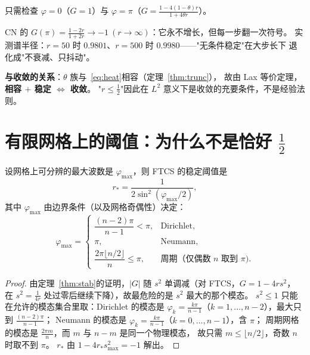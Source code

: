\begin{corollary}[稳定性只由两个数决定]
只需检查 $\varphi=0$（$G=1$）与 $\varphi=\pi$（$G=\frac{1-4(1-\theta)r}{1+4\theta r}$）。
\end{corollary}

\begin{corollary}[CN 的"稳定"退化]
\label{cor:cn}
CN 的 $G(\pi)=\frac{1-2r}{1+2r}\to-1\ (r\to\infty)$：它永不增长，但每一步翻一次符号。
实测谱半径：$r=50$ 时 $0.9801$、$r=500$ 时 $0.9980$——"无条件稳定"在大步长下
退化成"不衰减、只抖动"。
\end{corollary}

\textbf{与收敛的关系}：$\theta$ 族与~\eqref{eq:heat}相容（定理~\ref{thm:trunc}），
故由 Lax 等价定理，\textbf{相容 $+$ 稳定 $\iff$ 收敛}。
"$r\le\frac12$"因此在 $L^2$ 意义下是收敛的充要条件，不是经验法则。

\section{有限网格上的阈值：为什么不是恰好 $\tfrac12$}

\begin{theorem}[有限网格阈值]
\label{thm:finite}
设网格上可分辨的最大波数是 $\varphi_{\max}$，则 FTCS 的稳定阈值是
\begin{equation}
  r_*=\frac{1}{2\sin^2(\varphi_{\max}/2)} ,
  \label{eq:rcrit}
\end{equation}
其中 $\varphi_{\max}$ 由边界条件（以及网格奇偶性）决定：
\begin{equation}
  \varphi_{\max}=
  \begin{cases}
    \dfrac{(n-2)\pi}{n-1}<\pi, & \text{Dirichlet},\\[2mm]
    \pi, & \text{Neumann},\\[2mm]
    \dfrac{2\pi\lfloor n/2\rfloor}{n}\le\pi, & \text{周期（仅偶数 }n\text{ 取到 }\pi).
  \end{cases}
\end{equation}
\end{theorem}

\begin{proof}
由定理~\ref{thm:stab}的证明，$|G|$ 随 $s^2$ 单调减（对 FTCS，$G=1-4rs^2$，
在 $s^2=\frac{1}{4r}$ 处过零后继续下降），故最危险的是 $s^2$ 最大的那个模态。
$s^2\le1$ 只能在允许的模态集合里取：Dirichlet 的模态是
$\varphi_k=\frac{k\pi}{n-1}$（$k=1,\dots,n-2$），最大只到 $\frac{(n-2)\pi}{n-1}$；
Neumann 的模态是 $\varphi_k=\frac{k\pi}{n-1}$（$k=0,\dots,n-1$），含 $\pi$；
周期网格的模态是 $\frac{2\pi m}{n}$，而 $m$ 与 $n-m$ 是同一个物理模态，
故只需 $m\le\lfloor n/2\rfloor$，奇数 $n$ 时取不到 $\pi$。
$r_*$ 由 $1-4r_*s_{\max}^2=-1$ 解出。
\end{proof}

